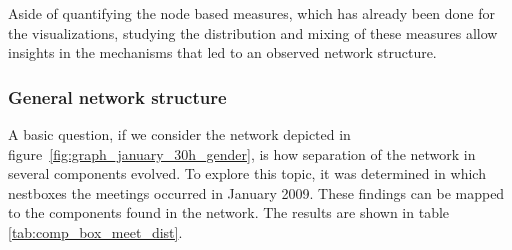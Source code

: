 Aside of quantifying the node based measures, which has already been done for the visualizations, studying the distribution and mixing of these measures allow insights in the mechanisms that led to an observed network structure.  

\subsubsection{General network structure}
\label{subsubsec:general_structure}

A basic question, if we consider the network depicted in figure~\ref{fig:graph_january_30h_gender}, is how separation of the network in several components evolved. To explore this topic, it was determined in which nestboxes the meetings occurred in January 2009. These findings can be mapped to the components found in the network. The results are shown in table \ref{tab:comp_box_meet_dist}.

